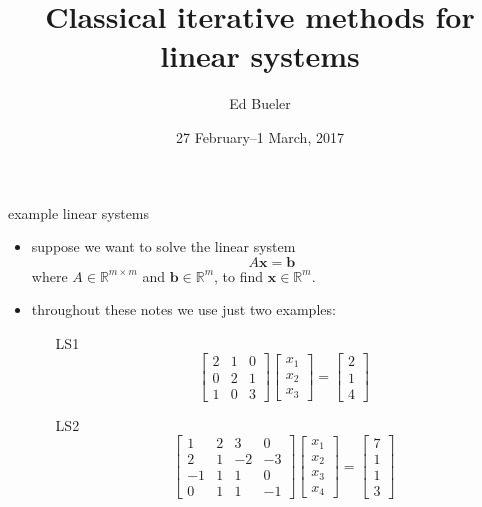 \documentclass[10pt,hyperref]{beamer}
\title{Classical iterative methods for linear systems}
\author{Ed Bueler}
\institute[MATH 615 NADEs]{MATH 615 Numerical Analysis of Differential Equations}
\date[Spring 2017]{27 February--1 March, 2017}
\newcommand{\bb}{\mathbf{b}}
\newcommand{\bx}{\mathbf{x}}
\newcommand{\RR}{\mathbb{R}}
\begin{document}
\begin{frame}
  \maketitle
\end{frame}


\begin{frame}{example linear systems}

\begin{itemize}
\item suppose we want to solve the linear system
\begin{equation}
A \bx = \bb \label{introsystem}
\end{equation}
where $A\in \RR^{m\times m}$ and $\bb\in \RR^m$, to find $\bx\in \RR^m$.
\item  throughout these notes we use just two examples:
  \begin{itemize}
  \item[LS1] 
\begin{equation*}
\begin{bmatrix} 2 & 1 & 0 \\
                0 & 2 & 1 \\
                1 & 0 & 3 \end{bmatrix}
\begin{bmatrix} x_1 \\ x_2 \\ x_3 \end{bmatrix}
=
\begin{bmatrix} 2 \\ 1 \\ 4 \end{bmatrix}
\end{equation*}
  \item[LS2]
\begin{equation*}
\begin{bmatrix} 1 & 2 & 3 & 0 \\
                2 & 1 &-2 &-3 \\
               -1 & 1 & 1 & 0 \\
                0 & 1 & 1 &-1 \end{bmatrix}
\begin{bmatrix} x_1 \\ x_2 \\ x_3 \\ x_4 \end{bmatrix}
=
\begin{bmatrix} 7 \\ 1 \\ 1 \\ 3 \end{bmatrix}

\end{equation*}
\end{itemize}
\end{itemize}
\end{frame}
\end{document}
